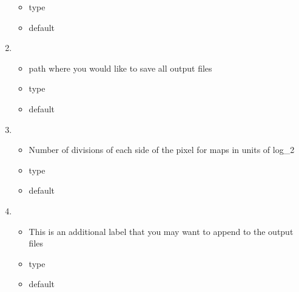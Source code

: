 \documentclass[letterpaper,10pt,english]{sphinxmanual}
\begin{document}
\begin{enumerate}
\begin{itemize}
\item {} 
\sphinxAtStartPar
type 

\item {} 
\sphinxAtStartPar
default 

\end{itemize}

\item {} 
\sphinxAtStartPar
{}
\begin{itemize}
\item {} 
\sphinxAtStartPar
path where you would like to save all output files

\item {} 
\sphinxAtStartPar
type 

\item {} 
\sphinxAtStartPar
default 

\end{itemize}

\item {} 
\sphinxAtStartPar
{}
\begin{itemize}
\item {} 
\sphinxAtStartPar
Number of divisions of each side of the pixel for 
maps in units of log\_2

\item {} 
\sphinxAtStartPar
type 

\item {} 
\sphinxAtStartPar
default 

\end{itemize}

\item {} 
\sphinxAtStartPar
{}
\begin{itemize}
\item {} 
\sphinxAtStartPar
This is an additional label that you may want to append to the
output files

\item {} 
\sphinxAtStartPar
type 

\item {} 
\sphinxAtStartPar
default 

\end{itemize}

\end{enumerate}
\end{document}
